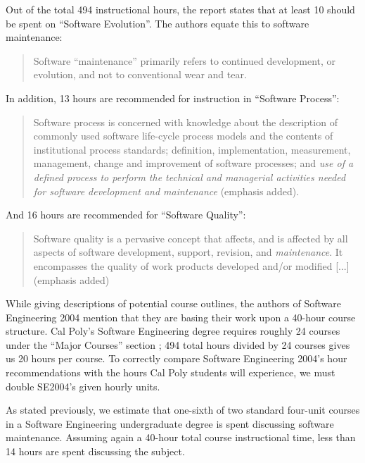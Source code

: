 \documentclass[11pt]{article}
\begin{document}
\begin{multicols}{2}
Out of the total 494 instructional hours, the report states that at least 10 should be spent on ``Software Evolution''.  The authors equate this to software maintenance:

\begin{quote}
Software ``maintenance'' primarily refers to continued development, or evolution, and not to conventional wear and tear. \cite{se2004}
\end{quote}

In addition, 13 hours are recommended for instruction in ``Software Process'':

\begin{quote}
Software process is concerned with knowledge about the description of commonly used software life-cycle process models and the contents of institutional process standards; definition, implementation, measurement, management, change and improvement of software processes; and \emph{use of a defined process to perform the technical and managerial activities needed for software development and maintenance} (emphasis added). \cite{se2004}
\end{quote}

And 16 hours are recommended for ``Software Quality'':

\begin{quote}
Software quality is a pervasive concept that affects, and is affected by all aspects of software development, support, revision, and \emph{maintenance}. It encompasses the quality of work products developed and/or modified [...] (emphasis added) \cite{se2004}
\end{quote}

While giving descriptions of potential course outlines, the authors of Software Engineering 2004 mention that they are basing their work upon a 40-hour course structure. \cite{se2004}  Cal Poly's Software Engineering degree requires roughly 24 courses under the ``Major Courses'' section \cite{catalogDegree}; 494 total hours divided by 24 courses gives us 20 hours per course.  To correctly compare Software Engineering 2004's hour recommendations with the hours Cal Poly students will experience, we must double SE2004's given hourly units.

As stated previously, we estimate that one-sixth of two standard four-unit courses in a Software Engineering undergraduate degree is spent discussing software maintenance.  Assuming again a 40-hour total course instructional time, less than 14 hours are spent discussing the subject.


\end{multicols}
\end{document}
